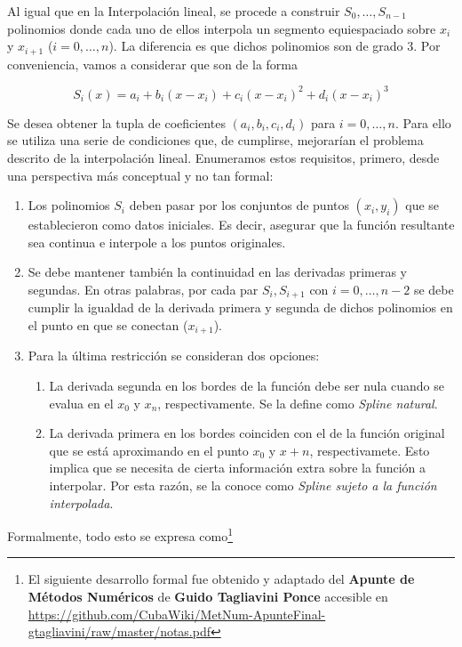 Al igual que en la Interpolaci\'on lineal, se procede a construir $S_0, \ldots, S_{n - 1}$ polinomios donde cada uno de ellos interpola un segmento equiespaciado sobre $x_i$ y $x_{i + 1}$ ($i = 0, \ldots, n$). La diferencia es que dichos polinomios son de grado 3. Por conveniencia, vamos a considerar que son de la forma

\[S_i(x) = a_i + b_i (x - x_i) + c_i (x - x_i)^2 + d_i (x - x_i)^3\]

Se desea obtener la tupla de coeficientes $(a_i,b_i,c_i,d_i)$ para $i = 0, \ldots, n$. Para ello se utiliza una serie de condiciones que, de cumplirse, mejorarían el problema descrito de la interpolación lineal. Enumeramos estos requisitos, primero, desde una perspectiva m\'as conceptual y no tan formal:

\begin{enumerate}
	\item Los polinomios $S_i$ deben pasar por los conjuntos de puntos $(x_i,y_i)$ que se establecieron como datos iniciales. Es decir, asegurar que la funci\'on resultante sea continua e interpole a los puntos originales.
	\item Se debe mantener tambi\'en la continuidad en las derivadas primeras y segundas. En otras palabras, por cada par $S_i, S_{i + 1}$ con $i = 0, \ldots, n-2$ se debe cumplir la igualdad de la derivada primera y segunda de dichos polinomios en el punto en que se conectan ($x_{i + 1}$).
	\item Para la \'ultima restricci\'on se consideran dos opciones:
		\begin{enumerate}
			\item La derivada segunda en los bordes de la funci\'on debe ser nula cuando se evalua en el $x_0$ y $x_n$, respectivamente. Se la define como \textit{Spline natural}.
			\item La derivada primera en los bordes coinciden con el de la funci\'on original que se est\'a aproximando en el punto $x_0$ y $x+n$, respectivamete. Esto implica que se necesita de cierta informaci\'on extra sobre la funci\'on a interpolar. Por esta raz\'on, se la conoce como \textit{Spline sujeto a la funci\'on interpolada}.  
		\end{enumerate}
\end{enumerate}

Formalmente, todo esto se expresa como\footnote{El siguiente desarrollo formal fue obtenido y adaptado del \textbf{Apunte de Métodos Numéricos} de \textbf{Guido Tagliavini Ponce} accesible en \url{https://github.com/CubaWiki/MetNum-ApunteFinal-gtagliavini/raw/master/notas.pdf}}

